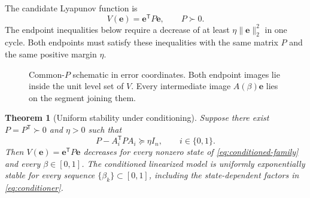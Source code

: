 \documentclass[pdflatex,iicol,sn-mathphys-ay]{sn-jnl}
\newtheorem{theorem}{Theorem}
\newcommand{\vect}[1]{\bm{#1}}
\begin{document}
The candidate Lyapunov function is
\[
    V(\vect{e})=\vect{e}^{\mathsf T}P\vect{e},\qquad P\succ0.
\]
The endpoint inequalities below require a decrease of at least $\eta\|\vect{e}\|_2^2$ in one cycle. Both endpoints must satisfy these inequalities with the same matrix $P$ and the same positive margin $\eta$.

\begin{figure}[t]
    \centering
    \resizebox{0.96\linewidth}{!}{}
    \caption{Common-$P$ schematic in error coordinates. Both endpoint images lie inside the unit level set of $V$. Every intermediate image $A(\beta)\vect{e}$ lies on the segment joining them.}
    \label{fig:common-p}
\end{figure}

\begin{theorem}[Uniform stability under conditioning]
\label{thm:common-p}
Suppose there exist $P=P^{\mathsf T}\succ0$ and $\eta>0$ such that
\begin{equation}
    P-A_i^{\mathsf T}PA_i\succeq\eta I_n,\qquad i\in\{0,1\}.
    \label{eq:endpoint-lmis}
\end{equation}
Then $V(\vect{e})=\vect{e}^{\mathsf T}P\vect{e}$ decreases for every nonzero state of \eqref{eq:conditioned-family} and every $\beta\in[0,1]$. The conditioned linearized model is uniformly exponentially stable for every sequence $\{\beta_k\}\subset[0,1]$, including the state-dependent factors in \eqref{eq:conditioner}.
\end{theorem}
\end{document}
